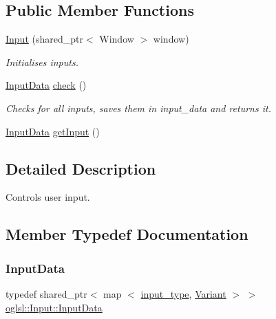 \subsection*{Public Member Functions}
\begin{DoxyCompactItemize}
\item 
\mbox{\hyperlink{classoglsl_1_1_input_a8cae9b7fdc8260372a57b9676d4162ca}{Input}} (shared\+\_\+ptr$<$ Window $>$ window)
\begin{DoxyCompactList}\small\item\em Initialises inputs. \end{DoxyCompactList}\item 
\mbox{\hyperlink{classoglsl_1_1_input_a3b21d7328538e661f366af5d6059c197}{Input\+Data}} \mbox{\hyperlink{classoglsl_1_1_input_ac52cca49e7cfd8b903cef7659cb3d355}{check}} ()
\begin{DoxyCompactList}\small\item\em Checks for all inputs, saves them in input\+\_\+data and returns it. \end{DoxyCompactList}\item 
\mbox{\hyperlink{classoglsl_1_1_input_a3b21d7328538e661f366af5d6059c197}{Input\+Data}} \mbox{\hyperlink{classoglsl_1_1_input_aa4a0967baed81cd85c6ebdf65fef492a}{get\+Input}} ()
\end{DoxyCompactItemize}


\subsection{Detailed Description}
Controls user input. 

\subsection{Member Typedef Documentation}
\mbox{\label{classoglsl_1_1_input_a3b21d7328538e661f366af5d6059c197}} 
\subsubsection{\texorpdfstring{Input\+Data}{InputData}}
{\footnotesize\ttfamily typedef shared\+\_\+ptr$<$ map $<$ \mbox{\hyperlink{classoglsl_1_1_input_a15a9c7fee0099a0ef55912433a402752}{input\+\_\+type}}, \mbox{\hyperlink{classoglsl_1_1_variant}{Variant}} $>$ $>$ \mbox{\hyperlink{classoglsl_1_1_input_a3b21d7328538e661f366af5d6059c197}{oglsl\+::\+Input\+::\+Input\+Data}}}



